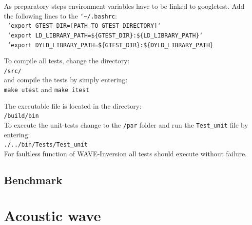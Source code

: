 \documentclass[pdftex,a4paper,parskip,listof=totoc,bibliography=totoc,onehalfspacing,12pt]{scrreprt}
\newcommand{\shellcmd}[1]{\indent\indent\texttt{#1}}	%
\newcommand{\shellcmdline}[1]{\indent\indent\texttt{\quad#1}} 	%
\begin{document}
As preparatory steps environment variables have to be linked to googletest. Add the following lines to the \shellcmd{{\char`\~}/.bashrc}:
\\\shellcmdline{ `export GTEST\_DIR=[PATH\_TO\_GTEST\_DIRECTORY]`}
\\\shellcmdline{ `export LD\_LIBRARY\_PATH=\$\{GTEST\_DIR\}:\$\{LD\_LIBRARY\_PATH\}`}
\\\shellcmdline{ `export DYLD\_LIBRARY\_PATH=\$\{GTEST\_DIR\}:\$\{DYLD\_LIBRARY\_PATH\}}

To compile all tests, change the directory: \\\shellcmdline{/src/} \\ and compile the tests by simply entering:\\\shellcmdline{make utest} and \shellcmdline{make itest}

The executable file is located in the directory:
\\\shellcmdline{/build/bin}\\
To execute the unit-tests change to the \shellcmd{/par} folder and run the \shellcmd{Test\_unit} file by entering:
\\\shellcmdline{./../bin/Tests/Test\_unit}\\ 
For faultless function of WAVE-Inversion all tests should execute without failure.

\section{Benchmark}

\cleardoublepage
{}
\listoffigures
{}
\listoftables
{}
\cleardoublepage

% 


\appendix
\chapter{Acoustic wave}
\label{sec:Acoustic_wave_equation}
\end{document}
